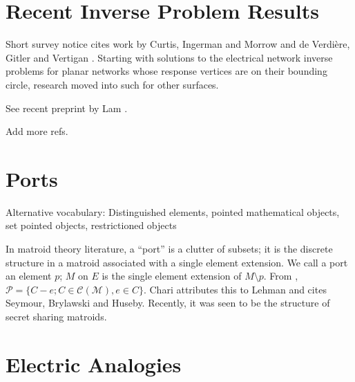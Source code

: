 \documentclass{article}
\begin{document}
\section{Recent Inverse Problem Results}



Short survey notice \cite{LamAMSNotice} cites
work by Curtis, Ingerman and Morrow \cite{CurtisIngermanMorrowCircPlanarRes}
and de Verdi{\`e}re, Gitler and Vertigan \cite{VertdiereGitlerVertigan}.
Starting with solutions to the electrical network inverse problems for planar
networks whose response vertices are on their bounding circle, research moved
into such for other surfaces.

See recent preprint by Lam \cite{LamElectroidVar2014}.

Add more refs.



\section{Ports}

Alternative vocabulary: 
Distinguished elements, pointed mathematical objects, set pointed objects, 
restrictioned objects

In matroid theory literature, a ``port'' is a clutter of subsets; it is the 
discrete structure in a matroid associated with a single element extension.
We call a port an element $p$; $M$ on $E$ is the single element extension
of $M\setminus p$.  From \cite{MatroidPortsSteinerShellChari}, 
$\mathcal{P}= \{ C - e; C\in\mathcal{C}(\mathcal{M}), e\in C\}$.
Chari attributes this to Lehman and cites Seymour, Brylawski and Huseby.
Recently, it was seen to be the structure of secret sharing matroids.

\section{Electric Analogies}
\end{document}
